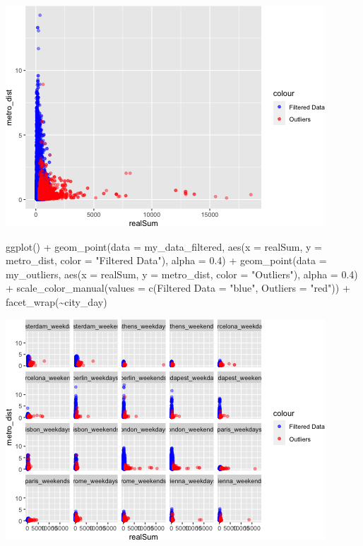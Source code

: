 \documentclass[
]{article}
\newenvironment{Shaded}{\begin{snugshade}}{\end{snugshade}}
\newcommand{\AttributeTok}[1]{\textcolor[rgb]{0.77,0.63,0.00}{#1}}
\newcommand{\FloatTok}[1]{\textcolor[rgb]{0.00,0.00,0.81}{#1}}
\newcommand{\FunctionTok}[1]{\textcolor[rgb]{0.00,0.00,0.00}{#1}}
\newcommand{\NormalTok}[1]{#1}
\newcommand{\OtherTok}[1]{\textcolor[rgb]{0.56,0.35,0.01}{#1}}
\newcommand{\SpecialCharTok}[1]{\textcolor[rgb]{0.00,0.00,0.00}{#1}}
\newcommand{\StringTok}[1]{\textcolor[rgb]{0.31,0.60,0.02}{#1}}
\begin{document}
\includegraphics{Project_files/figure-latex/unnamed-chunk-14-1.png}

\begin{Shaded}
\begin{Highlighting}[]
\FunctionTok{ggplot}\NormalTok{() }\SpecialCharTok{+} \FunctionTok{geom\_point}\NormalTok{(}\AttributeTok{data =}\NormalTok{ my\_data\_filtered, }\FunctionTok{aes}\NormalTok{(}\AttributeTok{x =}\NormalTok{ realSum,}
    \AttributeTok{y =}\NormalTok{ metro\_dist, }\AttributeTok{color =} \StringTok{"Filtered Data"}\NormalTok{), }\AttributeTok{alpha =} \FloatTok{0.4}\NormalTok{) }\SpecialCharTok{+}
    \FunctionTok{geom\_point}\NormalTok{(}\AttributeTok{data =}\NormalTok{ my\_outliers, }\FunctionTok{aes}\NormalTok{(}\AttributeTok{x =}\NormalTok{ realSum, }\AttributeTok{y =}\NormalTok{ metro\_dist,}
        \AttributeTok{color =} \StringTok{"Outliers"}\NormalTok{), }\AttributeTok{alpha =} \FloatTok{0.4}\NormalTok{) }\SpecialCharTok{+} \FunctionTok{scale\_color\_manual}\NormalTok{(}\AttributeTok{values =} \FunctionTok{c}\NormalTok{(}\StringTok{\textasciigrave{}}\AttributeTok{Filtered Data}\StringTok{\textasciigrave{}} \OtherTok{=} \StringTok{"blue"}\NormalTok{,}
    \AttributeTok{Outliers =} \StringTok{"red"}\NormalTok{)) }\SpecialCharTok{+} \FunctionTok{facet\_wrap}\NormalTok{(}\SpecialCharTok{\textasciitilde{}}\NormalTok{city\_day)}
\end{Highlighting}
\end{Shaded}

\includegraphics{Project_files/figure-latex/unnamed-chunk-14-2.png}
\end{document}
